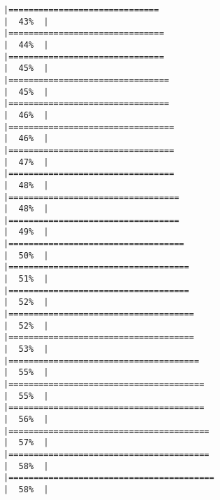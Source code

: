 \documentclass[
]{article}
\begin{document}
\begin{verbatim}
|==============================                                        |  43%  |                                                                              |===============================                                       |  44%  |                                                                              |===============================                                       |  45%  |                                                                              |================================                                      |  45%  |                                                                              |================================                                      |  46%  |                                                                              |=================================                                     |  46%  |                                                                              |=================================                                     |  47%  |                                                                              |=================================                                     |  48%  |                                                                              |==================================                                    |  48%  |                                                                              |==================================                                    |  49%  |                                                                              |===================================                                   |  50%  |                                                                              |====================================                                  |  51%  |                                                                              |====================================                                  |  52%  |                                                                              |=====================================                                 |  52%  |                                                                              |=====================================                                 |  53%  |                                                                              |======================================                                |  55%  |                                                                              |=======================================                               |  55%  |                                                                              |=======================================                               |  56%  |                                                                              |========================================                              |  57%  |                                                                              |========================================                              |  58%  |                                                                              |=========================================                             |  58%  |                                                                              
\end{verbatim}
\end{document}
